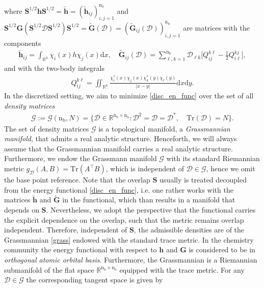 \documentclass[reqno]{amsart}
\begin{document}
where $\mathbf{S}^{1/2}\mathbf{h}\mathbf{S}^{1/2}=\tilde{\mathbf{h}}=(\tilde{\mathbf{h}}_{ij})_{i,j=1}^{\text{n}_\text{b}}$ and $\mathbf{S}^{1/2}\mathbf{G}(\mathbf{S}^{1/2}\mathscr{D}\mathbf{S}^{1/2})\mathbf{S}^{1/2}=\tilde{\mathbf{G}}(\mathscr{D})=(\tilde{\mathbf{G}}_{ij}(\mathscr{D}))_{i,j=1}^{\text{n}_\text{b}}$ are matrices with the components
\begin{align*}
    \tilde{\mathbf{h}}_{ij}=\int_{\mathbb{R}^3}\chi_i(x)h\chi_j(x)\mathrm{d}x,\quad \tilde{\mathbf{G}}_{ij}(\mathscr{D})=\sum_{\ell,k=1}^{\text{n}_\text{b}}\mathscr{D}_{\ell k}\Big[ Q_{ij}^{k\ell }-\tfrac{1}{2}Q_{i\ell}^{kj}\Big],
\end{align*}
and with the two-body integrals
\begin{align*}
    Q_{ij}^{k\ell}= \iint_{\mathbb{R}^6} \frac{\chi^*_{i}(x)\chi_j(x)\chi^*_{k}(y)\chi_{\ell}(y)}{|x-y|}\mathrm{d}x\mathrm{d}y.
\end{align*}
In the discretized setting, we aim to minimize \eqref{disc_en_func} over the set of all \textit{density matrices}
\begin{align}\label{grass}
    \mathcal{G}:=\mathcal{G}(\text{n}_{\text{b}},N)=\big\lbrace \mathscr{D}\in \mathbb{R}^{\text{n}_\text{b}\times \text{n}_\text{b}}: \mathscr{D}^2=\mathscr{D}=\mathscr{D}^*,\quad \text{Tr}(\mathscr{D})=N\big\rbrace.
\end{align}
The set of density matrices $\mathcal{G}$ is a topological manifold, a \textit{Grassmannian manifold}, that admits a real analytic structure. Henceforth, we will always assume that the Grassmannian manifold carries a real analytic structure. Furthermore, we endow the Grassmann manifold $\mathcal{G}$ with its standard Riemannian metric $g_{\mathscr{D}}(A,B)=\text{Tr}(A^\top B) $, which is independent of $\mathscr{D}\in \mathcal{G}$, hence we omit the base point reference. Note that the overlap $\mathbf{S}$ usually is treated decoupled from the energy functional \eqref{disc_en_func}, i.e. one rather works with the matrices $\tilde{\mathbf{h}}$ and $\tilde{\mathbf{G}}$ in the functional, which than results in a manifold that depends on $\mathbf{S}$. Nevertheless, we adopt the perspective that the functional carries the explicit dependence on the overlap, such that the metric remains overlap independent. Therefore, independent of $\mathbf{S}$, the admissible densities are of the Grassmannian \eqref{grass} endowed with the standard trace metric.  In the chemistry community the energy functional with respect to $\mathbf{h}$ and $\mathbf{G}$ is considered to be in \textit{orthogonal atomic orbital basis}. Furthermore, the Grassmannian is a Riemannian submanifold of the flat space    $\mathbb{R}^{\text{n}_\text{b}\times \text{n}_\text{b}}$ equipped with the trace metric. For any $\mathscr{D}\in\mathcal{G}$ the corresponding tangent space is given by
\end{document}
